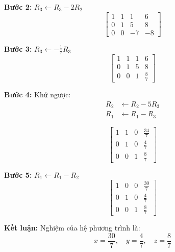 \documentclass[12pt]{article}
\begin{document}
\textbf{Bước 2:} \( R_3 \leftarrow R_3 - 2R_2 \)
\[
\begin{bmatrix}
1 & 1 & 1 & 6 \\
0 & 1 & 5 & 8 \\
0 & 0 & -7 & -8
\end{bmatrix}
\]

\textbf{Bước 3:} \( R_3 \leftarrow -\frac{1}{7}R_3 \)
\[
\begin{bmatrix}
1 & 1 & 1 & 6 \\
0 & 1 & 5 & 8 \\
0 & 0 & 1 & \frac{8}{7}
\end{bmatrix}
\]

\textbf{Bước 4:} Khử ngược:
\begin{align*}
R_2 &\leftarrow R_2 - 5R_3 \\
R_1 &\leftarrow R_1 - R_3
\end{align*}

\[
\begin{bmatrix}
1 & 1 & 0 & \frac{34}{7} \\
0 & 1 & 0 & \frac{4}{7} \\
0 & 0 & 1 & \frac{8}{7}
\end{bmatrix}
\]

\textbf{Bước 5:} \( R_1 \leftarrow R_1 - R_2 \)
\[
\begin{bmatrix}
1 & 0 & 0 & \frac{30}{7} \\
0 & 1 & 0 & \frac{4}{7} \\
0 & 0 & 1 & \frac{8}{7}
\end{bmatrix}
\]

\textbf{Kết luận:} Nghiệm của hệ phương trình là:
\[
x = \frac{30}{7}, \quad y = \frac{4}{7}, \quad z = \frac{8}{7}
\]
\end{document}
